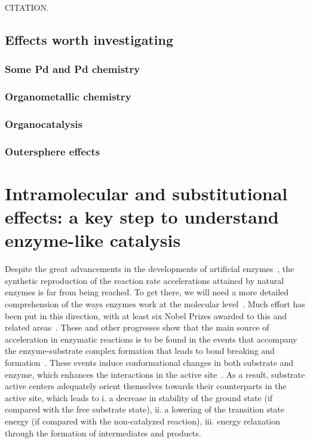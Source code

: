 CITATION.

\subsection{Effects worth investigating}

\subsubsection{Some Pd and Pd chemistry}

\subsubsection{Organometallic chemistry}

\subsubsection{Organocatalysis}

\subsubsection{Outersphere effects}

\section{Intramolecular and substitutional effects: a key step to understand
enzyme-like catalysis}

Despite the great advancements in the developments of artificial enzymes~\cite{Breslow_1995},
the synthetic reproduction of the reaction rate accelerations attained by
natural enzymes is far from being reached.
To get there, we will need a more detailed comprehension of the ways enzymes
work at the molecular level~\cite{Catalysis_in_Chemistry_and_Enzymology}.
Much effort has been put in this direction, with at least six Nobel Prizes
awarded to this and related areas~\cite{Nobel_1929,Nobel_1946,Nobel_1957,Nobel_1975,Nobel_1997,Nobel_2013}.
These and other progresses show that the main source of acceleration in
enzymatic reactions is to be found in the events that accompany the
enzyme-substrate complex formation that leads to bond breaking and
formation~\cite{Catalysis_in_Chemistry_and_Enzymology}.
These events induce conformational changes in both substrate and enzyme, which
enhances the interactions in the active site~\cite{Fischer_1890,Fischer_1894,Koshland_1958,Dafforn_1971,Kirby_1996}.
As a result, substrate active centers adequately orient themselves towards
their counterparts in the active site, which leads to
i. a decrease in stability of the ground state (if compared with the
        free substrate state),
ii. a lowering of the transition state energy (if compared with the
        non-catalyzed reaction),
iii. energy relaxation through the formation of intermediates and
        products.

